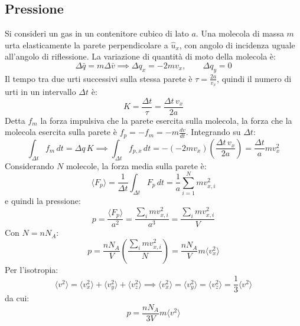 \documentclass[11pt, a4paper, openright]{book}
\theoremstyle{plain}
\theoremstyle{definition}
\theoremstyle{remark}
\begin{document}
\subsection{Pressione}
Si consideri un gas in un contenitore cubico di lato $a$. Una molecola di massa $m$ urta elasticamente la parete perpendicolare a $\hat{u}_x$, con angolo di incidenza uguale all'angolo di riflessione. La variazione di quantità di moto della molecola è:
\begin{equation}
    \Delta\bar{q} = m\Delta\bar{v} \implies \Delta q_x = -2mv_x, \qquad \Delta q_y = 0
\end{equation}
Il tempo tra due urti successivi sulla stessa parete è $\tau = \frac{2a}{v_x}$, quindi il numero di urti in un intervallo $\Delta t$ è:
\begin{equation}
    K = \frac{\Delta t}{\tau} = \frac{\Delta t\, v_x}{2a}
\end{equation}
Detta $f_m$ la forza impulsiva che la parete esercita sulla molecola, la forza che la molecola esercita sulla parete è $f_p = -f_m = -m\frac{dv}{dt}$. Integrando su $\Delta t$:
\begin{equation}
    \int_{\Delta t} f_m\,dt = \Delta q\, K \implies \int_{\Delta t} f_{p,x}\,dt = -(-2mv_x)\left(\frac{\Delta t\, v_x}{2a}\right) = \frac{\Delta t}{a}mv_x^2
\end{equation}
Considerando $N$ molecole, la forza media sulla parete è:
\begin{equation}
    \langle F_p\rangle = \frac{1}{\Delta t}\int_{\Delta t} F_p\,dt = \frac{1}{a}\sum_{i = 1}^N mv_{x,i}^2
\end{equation}
e quindi la pressione:
\begin{equation}
    p = \frac{\langle F_p\rangle}{a^2} = \frac{\sum_i mv_{x,i}^2}{a^3} = \frac{\sum_i mv_{x,i}^2}{V}
\end{equation}
Con $N = nN_A$:
\begin{equation}
    p = \frac{nN_A}{V}\left(\frac{\sum_i mv_{x,i}^2}{N}\right) = \frac{nN_A}{V}m\langle v_x^2\rangle
\end{equation}
Per l'isotropia:
\begin{equation}
    \langle v^2\rangle = \langle v_x^2\rangle + \langle v_y^2\rangle + \langle v_z^2\rangle \implies \langle v_x^2\rangle = \langle v_y^2\rangle = \langle v_z^2\rangle = \frac{1}{3}\langle v^2\rangle
\end{equation}
da cui:
\begin{equation}
    \boxed{p = \frac{nN_A}{3V}m\langle v^2\rangle}
\end{equation}
\end{document}
